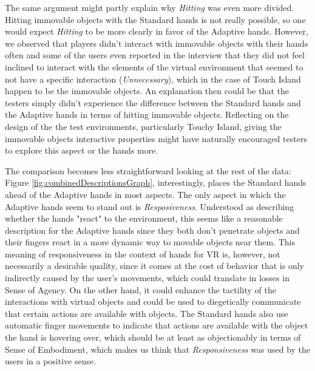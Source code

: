 The same argument might partly explain why \textit{Hitting} was even more divided. Hitting immovable objects with the Standard hands is not really possible, so one would expect \textit{Hitting} to be more clearly in favor of the Adaptive hands. However, we observed that players didn't interact with immovable objects with their hands often and some of the users even reported in the interview that they did not feel inclined to interact with the elements of the virtual environment that seemed to not have a specific interaction (\textit{Unnecessary}), which in the case of Touch Island happen to be the immovable objects. An explanation then could be that the testers simply didn't experience the difference between the Standard hands and the Adaptive hands in terms of hitting immovable objects. Reflecting on the design of the the test environments, particularly Touchy Island, giving the immovable objects interactive properties might have naturally encouraged testers to explore this aspect or the hands more.




The comparison becomes less straightforward looking at the rest of the data: Figure \ref{fig:combinedDescriptionsGraph}, interestingly, places the Standard hands ahead of the Adaptive hands in most aspects. The only aspect in which the Adaptive hands seem to stand out is \textit{Resposiveness}. Understood as describing whether the hands "react" to the environment, this seems like a reasonable description for the Adaptive hands since they both don't penetrate objects and their fingers react in a more dynamic way to movable objects near them. This meaning of responsiveness in the context of hands for VR is, however, not necessarily a desirable quality, since it comes at the cost of behavior that is only indirectly caused by the user's movements, which could translate in losses in Sense of Agency. On the other hand, it could enhance the tactility of the interactions with virtual objects and could be used to diegetically communicate that certain actions are available with objects. The Standard hands also use automatic finger movements to indicate that actions are available with the object the hand is hovering over, which should be at least as objectionably in terms of Sense of Embodiment, which makes us think that \textit{Responsiveness} was used by the users in a positive sense.

